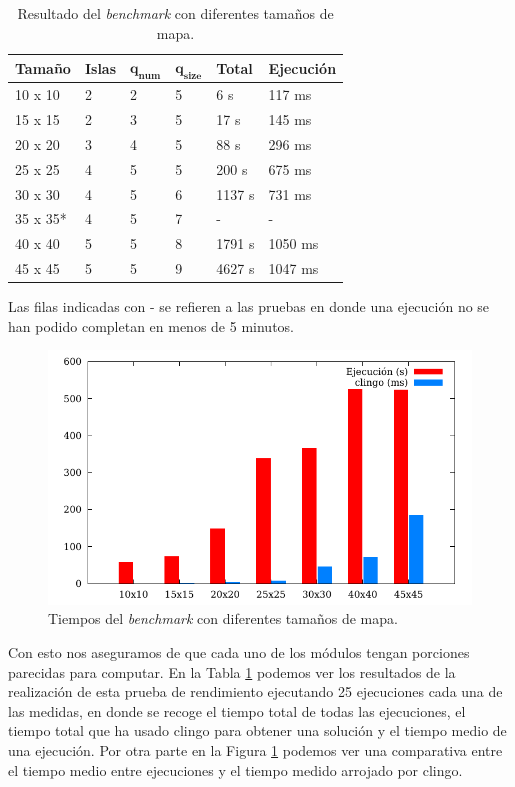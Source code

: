 \begin{table}[!h]
	\begin{tabularx}{\textwidth}{ X X X X X X }
		\bfseries{Tamaño} & \bfseries{Islas} & $\mathbf{q_{num}}$ & $\mathbf{q_{size}}$ & \bfseries{Total} & \bfseries{Ejecución} \\
		\hline
		10 x 10 & 2 & 2 & 5 & 6 s & 117 ms \\
		15 x 15 & 2 & 3 & 5 & 17 s & 145 ms \\
		20 x 20 & 3 & 4 & 5 & 88 s & 296 ms \\
		25 x 25 & 4 & 5 & 5 & 200 s & 675 ms \\
		30 x 30 & 4 & 5 & 6 & 1137 s & 731 ms \\
		35 x 35* & 4 & 5 & 7 & - & - \\
		40 x 40 & 5 & 5 & 8 & 1791 s & 1050 ms \\
		45 x 45 & 5 & 5 & 9 & 4627 s & 1047 ms \\
		\hline
	\end{tabularx}
	\begin{tablenotes}
		\item[1] Las filas indicadas con - se refieren a las pruebas en donde una ejecución no se han podido completan en menos de 5 minutos.
	\end{tablenotes}
	\caption{Resultado del \textit{benchmark} con diferentes tamaños de mapa.}\label{table:mapresult}
\end{table}

\begin{figure}[!h]
	\centering
	\includegraphics[width=.8\textwidth]{tables/map-size.pdf}
	\caption{Tiempos del \textit{benchmark} con diferentes tamaños de mapa.}\label{fig:mapresult}
\end{figure}

Con esto nos aseguramos de que cada uno de los módulos tengan porciones parecidas para computar. En la Tabla \ref{table:mapresult} podemos ver los resultados de la realización de esta prueba de rendimiento ejecutando 25 ejecuciones cada una de las medidas, en donde se recoge el tiempo total de todas las ejecuciones, el tiempo total que ha usado clingo para obtener una solución y el tiempo medio de una ejecución. Por otra parte en la Figura \ref{fig:mapresult} podemos ver una comparativa entre el tiempo medio entre ejecuciones y el tiempo medido arrojado por clingo. \\

